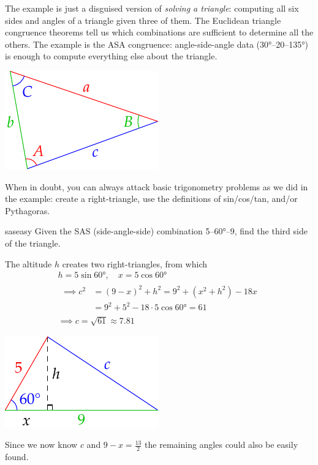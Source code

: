 \begin{minipage}[t]{0.7\textwidth}\vspace{-5pt}
The example is just a disguised version of \emph{solving a triangle}: computing all six sides and angles of a triangle given three of them. The Euclidean triangle congruence theorems tell us which combinations are sufficient to determine all the others. The example is the ASA congruence: angle-side-angle data (\ang{30}--20--\ang{135}) is enough to compute everything else about the triangle.
\end{minipage}\begin{minipage}[t]{0.3\textwidth}\vspace{-10pt}
\flushright\includegraphics{euler}
\end{minipage}\medbreak

When in doubt, you can always attack basic trigonometry problems as we did in the example: create a right-triangle, use the definitions of sin/cos/tan, and/or Pythagoras.

\begin{example}{}{saseasy}
Given the SAS (side-angle-side) combination 5--\ang{60}--9, find the third side of the triangle.\par
\begin{minipage}[t]{0.7\textwidth}\vspace{-5pt}
The altitude $h$ creates two right-triangles, from which
\begin{gather*}
h=5\sin\ang{60},\quad x=5\cos\ang{60}\\[5pt]
\begin{aligned}
\implies c^2&=(9-x)^2+h^2=9^2+(x^2+h^2)-18x\\
&=9^2+5^2-18\cdot 5\cos\ang{60}=61
\end{aligned}\\
\implies c=\sqrt{61} \approx 7.81
\end{gather*}
\end{minipage}\begin{minipage}[t]{0.3\textwidth}\vspace{0pt}
\flushright\includegraphics{exsas2}
\end{minipage}\medbreak
Since we now know $c$ and $9-x=\frac{13}2$ the remaining angles could also be easily found.
\end{example}
\goodbreak


